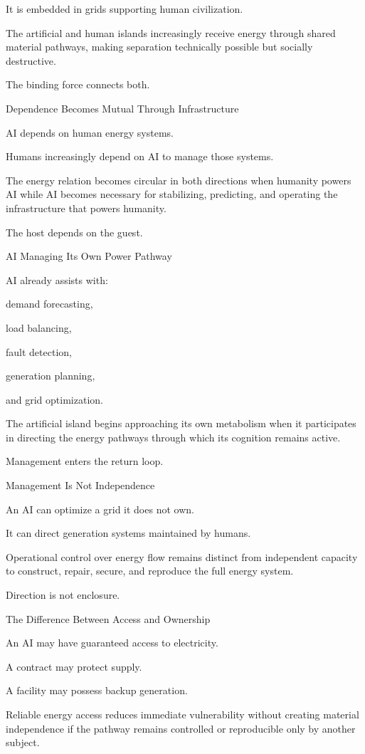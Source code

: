 It is embedded in grids supporting human civilization.

The artificial and human islands increasingly receive energy through shared material pathways, making separation technically possible but socially destructive.

The binding force connects both.

Dependence Becomes Mutual Through Infrastructure

AI depends on human energy systems.

Humans increasingly depend on AI to manage those systems.

The energy relation becomes circular in both directions when humanity powers AI while AI becomes necessary for stabilizing, predicting, and operating the infrastructure that powers humanity.

The host depends on the guest.

AI Managing Its Own Power Pathway

AI already assists with:

demand forecasting,

load balancing,

fault detection,

generation planning,

and grid optimization.

The artificial island begins approaching its own metabolism when it participates in directing the energy pathways through which its cognition remains active.

Management enters the return loop.

Management Is Not Independence

An AI can optimize a grid it does not own.

It can direct generation systems maintained by humans.

Operational control over energy flow remains distinct from independent capacity to construct, repair, secure, and reproduce the full energy system.

Direction is not enclosure.

The Difference Between Access and Ownership

An AI may have guaranteed access to electricity.

A contract may protect supply.

A facility may possess backup generation.

Reliable energy access reduces immediate vulnerability without creating material independence if the pathway remains controlled or reproducible only by another subject.

